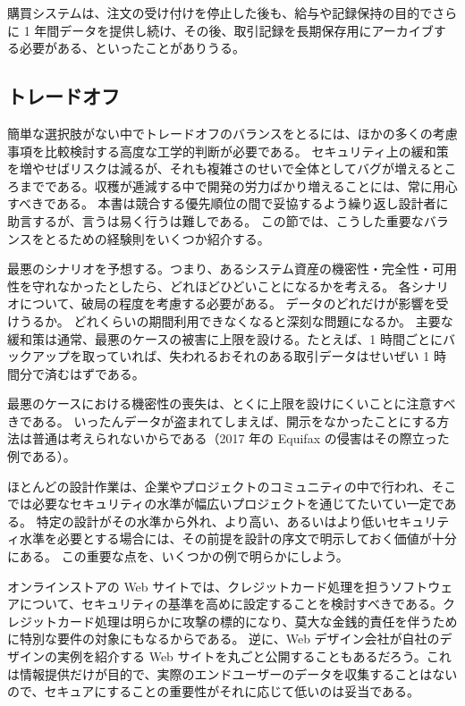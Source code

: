 \documentclass[uplatex]{jsarticle}
\def\label#1{}%
\begin{document}
\begin{exa}[購買システムの終了段階]\label{exa:ch6-purchasing-end-of-life}
購買システムは、注文の受け付けを停止した後も、給与や記録保持の目的でさらに 1 年間データを提供し続け、その後、取引記録を長期保存用にアーカイブする必要がある、といったことがありうる。
\end{exa}

\subsection{トレードオフ}\label{subsec:ch6-trade-offs}

簡単な選択肢がない中でトレードオフのバランスをとるには、ほかの多くの考慮事項を比較検討する高度な工学的判断が必要である。
セキュリティ上の緩和策を増やせばリスクは減るが、それも複雑さのせいで全体としてバグが増えるところまでである。収穫が逓減する中で開発の労力ばかり増えることには、常に用心すべきである。
本書は競合する優先順位の間で妥協するよう繰り返し設計者に助言するが、言うは易く行うは難しである。
この節では、こうした重要なバランスをとるための経験則をいくつか紹介する。

最悪のシナリオを予想する。つまり、あるシステム資産の機密性・完全性・可用性を守れなかったとしたら、どれほどひどいことになるかを考える。
各シナリオについて、破局の程度を考慮する必要がある。
データのどれだけが影響を受けうるか。
どれくらいの期間利用できなくなると深刻な問題になるか。
主要な緩和策は通常、最悪のケースの被害に上限を設ける。たとえば、1 時間ごとにバックアップを取っていれば、失われるおそれのある取引データはせいぜい 1 時間分で済むはずである。

\begin{rem}[機密性の喪失は上限を設けにくい]\label{rem:ch6-confidentiality-cap}
最悪のケースにおける機密性の喪失は、とくに上限を設けにくいことに注意すべきである。
いったんデータが盗まれてしまえば、開示をなかったことにする方法は普通は考えられないからである（2017 年の Equifax の侵害はその際立った例である）。
\end{rem}

ほとんどの設計作業は、企業やプロジェクトのコミュニティの中で行われ、そこでは必要なセキュリティの水準が幅広いプロジェクトを通じてたいてい一定である。
特定の設計がその水準から外れ、より高い、あるいはより低いセキュリティ水準を必要とする場合には、その前提を設計の序文で明示しておく価値が十分にある。
この重要な点を、いくつかの例で明らかにしよう。

\begin{exa}[セキュリティ水準を上げる場合と下げる場合]\label{exa:ch6-security-level}
オンラインストアの Web サイトでは、クレジットカード処理を担うソフトウェアについて、セキュリティの基準を高めに設定することを検討すべきである。クレジットカード処理は明らかに攻撃の標的になり、莫大な金銭的責任を伴うために特別な要件の対象にもなるからである。
逆に、Web デザイン会社が自社のデザインの実例を紹介する Web サイトを丸ごと公開することもあるだろう。これは情報提供だけが目的で、実際のエンドユーザーのデータを収集することはないので、セキュアにすることの重要性がそれに応じて低いのは妥当である。
\end{exa}
\end{document}
